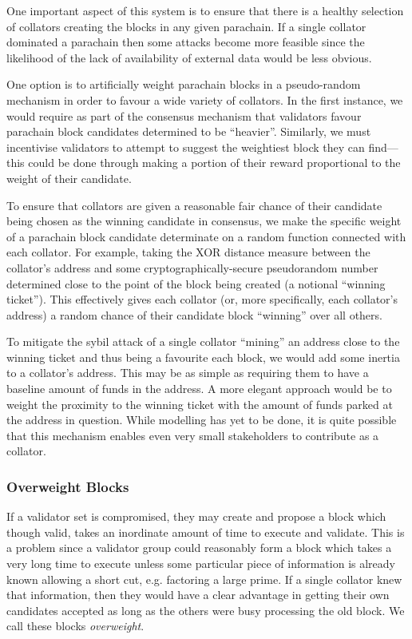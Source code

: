 \documentclass[usepdftitle=false]{beamer}
\makeatletter
\newcommand*\eg{e.g.\@\xspace}
\makeatother
\begin{document}
\begin{frame}
 One important aspect of this system is to ensure that there is a healthy selection of collators creating the blocks in any given parachain. If a single collator dominated a parachain then some attacks become more feasible since the likelihood of the lack of availability of external data would be less obvious.

 One option is to artificially weight parachain blocks in a pseudo-random mechanism in order to favour a wide variety of collators. In the first instance, we would require as part of the consensus mechanism that validators favour parachain block candidates determined to be ``heavier''. Similarly, we must incentivise validators to attempt to suggest the weightiest block they can find---this could be done through making a portion of their reward proportional to the weight of their candidate.

 To ensure that collators are given a reasonable fair chance of their candidate being chosen as the winning candidate in consensus, we make the specific weight of a parachain block candidate determinate on a random function connected
with each collator. For example, taking the {\small XOR} distance measure between the collator's address and some cryptographically-secure pseudorandom number determined close to the point of the block being created (a notional ``winning ticket''). This effectively gives each collator (or, more specifically, each collator's address) a random chance of their candidate block ``winning'' over all others.

 To mitigate the sybil attack of a single collator ``mining'' an address close to the winning ticket and thus being a favourite each block, we would add some inertia to a collator's address. This may be as simple as requiring them to have a baseline amount of funds in the address. A more elegant approach would be to weight the proximity to the winning ticket with the amount of funds parked at the address in question. While modelling has yet to be done, it is quite possible that this mechanism enables even very small stakeholders to contribute as a collator.
 
 \subsubsection{Overweight Blocks}
 
If a validator set is compromised, they may create and propose a block which though valid, takes an inordinate amount of time to execute and validate. This is a problem since a validator group could reasonably form a block which takes a very long time to execute unless some particular piece of information is already known allowing a short cut, \eg factoring a large prime. If a single collator knew that information, then they would have a clear advantage in getting their own candidates accepted as long as the others were busy processing the old block. We call these blocks \textit{overweight}.


\end{frame}
\end{document}
